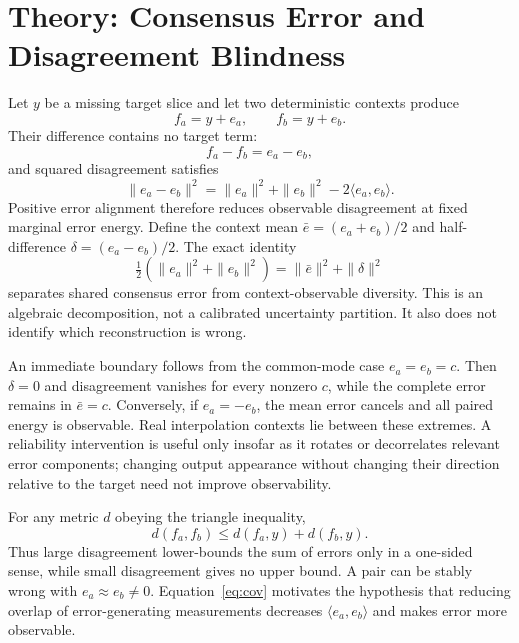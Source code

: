 \documentclass[journal,10pt]{IEEEtran}
\begin{document}
\section{Theory: Consensus Error and Disagreement Blindness}
Let $y$ be a missing target slice and let two deterministic contexts produce
\begin{equation}
 f_a=y+e_a,\qquad f_b=y+e_b.
\end{equation}
Their difference contains no target term:
\begin{equation}
 f_a-f_b=e_a-e_b,
\end{equation}
and squared disagreement satisfies
\begin{equation}
 \|e_a-e_b\|^2=\|e_a\|^2+\|e_b\|^2-2\langle e_a,e_b\rangle. \label{eq:cov}
\end{equation}
Positive error alignment therefore reduces observable disagreement at fixed marginal error energy. Define the context mean $\bar e=(e_a+e_b)/2$ and half-difference $\delta=(e_a-e_b)/2$. The exact identity
\begin{equation}
 \tfrac12(\|e_a\|^2+\|e_b\|^2)=\|\bar e\|^2+\|\delta\|^2 \label{eq:decomp}
\end{equation}
separates shared consensus error from context-observable diversity. This is an algebraic decomposition, not a calibrated uncertainty partition. It also does not identify which reconstruction is wrong.

An immediate boundary follows from the common-mode case $e_a=e_b=c$. Then $\delta=0$ and disagreement vanishes for every nonzero $c$, while the complete error remains in $\bar e=c$. Conversely, if $e_a=-e_b$, the mean error cancels and all paired energy is observable. Real interpolation contexts lie between these extremes. A reliability intervention is useful only insofar as it rotates or decorrelates relevant error components; changing output appearance without changing their direction relative to the target need not improve observability.

For any metric $d$ obeying the triangle inequality,
\begin{equation}
 d(f_a,f_b)\leq d(f_a,y)+d(f_b,y).
\end{equation}
Thus large disagreement lower-bounds the sum of errors only in a one-sided sense, while small disagreement gives no upper bound. A pair can be stably wrong with $e_a\approx e_b\neq0$. Equation~\eqref{eq:cov} motivates the hypothesis that reducing overlap of error-generating measurements decreases $\langle e_a,e_b\rangle$ and makes error more observable.
\end{document}
